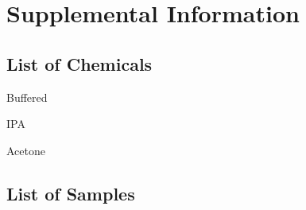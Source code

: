 \chapter{Supplemental Information}
\label{chap:appendix}
\thispagestyle{empty}


\section{List of Chemicals}
\label{sup:LoChemicals}





Buffered 





IPA

Acetone

\clearpage


\section{List of Samples}
\label{sup:LoSamples}

